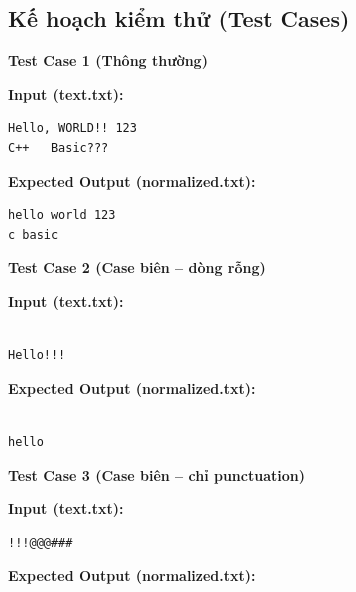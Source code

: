 \subsection{Kế hoạch kiểm thử (Test Cases)}

\textbf{Test Case 1 (Thông thường)}

\textbf{Input (text.txt):}

\begin{lstlisting}
Hello, WORLD!! 123
C++   Basic???
\end{lstlisting}

\textbf{Expected Output (normalized.txt):}

\begin{lstlisting}
hello world 123
c basic
\end{lstlisting}

\vspace{0.5cm}

\textbf{Test Case 2 (Case biên -- dòng rỗng)}

\textbf{Input (text.txt):}

\begin{lstlisting}

Hello!!!
\end{lstlisting}

\textbf{Expected Output (normalized.txt):}

\begin{lstlisting}

hello
\end{lstlisting}

\vspace{0.5cm}

\textbf{Test Case 3 (Case biên -- chỉ punctuation)}

\textbf{Input (text.txt):}

\begin{lstlisting}
!!!@@@###
\end{lstlisting}

\textbf{Expected Output (normalized.txt):}

\begin{lstlisting}

\end{lstlisting}